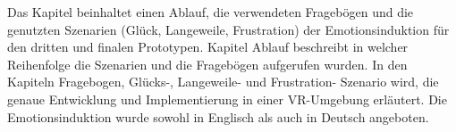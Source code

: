 

Das Kapitel beinhaltet einen Ablauf, die verwendeten Frageb{\"o}gen und die genutzten Szenarien (Gl{\"u}ck, Langeweile, Frustration) der Emotionsinduktion f{\"u}r den dritten und finalen Prototypen. 
Kapitel Ablauf beschreibt in welcher Reihenfolge die Szenarien und die Frageb{\"o}gen aufgerufen wurden. 
In den Kapiteln Fragebogen, Gl{\"u}cks-, Langeweile- und Frustration- Szenario wird, die genaue Entwicklung und Implementierung in einer VR-Umgebung erl{\"a}utert.
Die Emotionsinduktion wurde sowohl in Englisch als auch in Deutsch angeboten.






